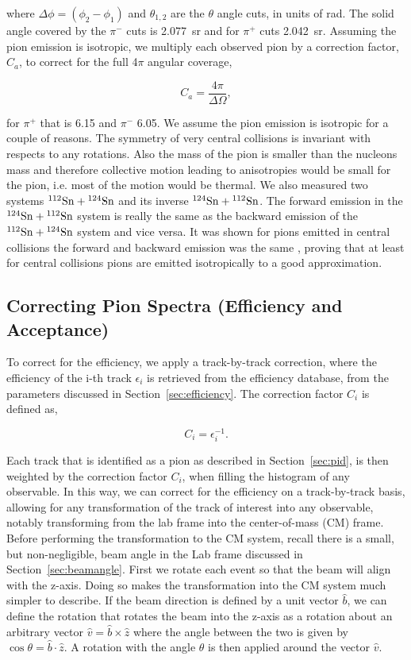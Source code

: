 where $\Delta\phi = (\phi_2 - \phi_1)$  and $\theta_{1,2}$ are the $\theta$ angle cuts, in units of \si{\radian}. The solid angle covered by the $\pi^-$ cuts is \SI{2.077}{\steradian} and for $\pi^+$ cuts \SI{2.042}{\steradian}. Assuming the pion emission is isotropic, we multiply each observed pion by a correction factor, $C_a$, to correct for the full 4$\pi$ angular coverage, 

\begin{equation}
C_a = \frac{4\pi}{\Delta\Omega},
\end{equation}

for $\pi^+$ that is \num{6.15} and $\pi^-$ \num{6.05}. We assume the pion emission is isotropic for a couple of reasons. The symmetry of very central collisions is invariant with respects to any rotations. Also the mass of the pion is smaller than the nucleons mass and therefore collective motion leading to anisotropies would be small for the pion, i.e. most of the motion would be thermal. We also measured two systems ${}^{112}\mathrm{Sn} + {}^{124}\mathrm{Sn}$ and its inverse ${}^{124}\mathrm{Sn} + {}^{112}\mathrm{Sn}$. The forward emission in the ${}^{124}\mathrm{Sn} + {}^{112}\mathrm{Sn}$ system is really the same as the backward emission of the ${}^{112}\mathrm{Sn} + {}^{124}\mathrm{Sn}$ system and vice versa. It was shown for pions emitted in central collisions the forward and backward emission was the same \cite{jon}, proving that at least for central collisions pions are emitted isotropically to a good approximation. 


\subsection{Correcting Pion Spectra (Efficiency and Acceptance)}


To correct for the efficiency, we apply a track-by-track correction, where the efficiency of the i-th track $\epsilon_i$ is retrieved from the efficiency database, from the parameters discussed in Section~\ref{sec:efficiency}. The correction factor $C_i$ is defined as,

\begin{equation}
C_i = \epsilon_i^{-1}.
\end{equation}

Each track that is identified as a pion as described in Section~\ref{sec:pid}, is then weighted by the correction factor $C_i$, when filling the histogram of any observable. In this way, we can correct for the efficiency on a track-by-track basis, allowing for any transformation of the track of interest into any observable, notably transforming from the lab frame into the center-of-mass (CM) frame. Before performing the transformation to the CM system, recall there is a small, but non-negligible, beam angle in the Lab frame discussed in Section~\ref{sec:beamangle}. First we rotate each event so that the beam will align with the z-axis. Doing so makes the transformation into the CM system much simpler to describe. If the beam direction is defined by a unit vector $\hat{b}$, we can define the rotation that rotates the beam into the z-axis as a rotation about an arbitrary vector $\hat{v} = \hat{b}\times\hat{z}$ where the angle between the two is given by $\cos \theta = \hat{b}\cdot\hat{z}$. A rotation with the angle $\theta$ is then applied around the vector $\hat{v}$.

